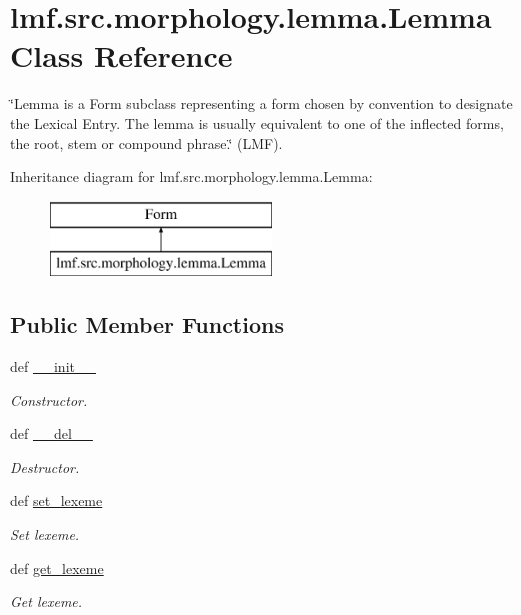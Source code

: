 \hypertarget{classlmf_1_1src_1_1morphology_1_1lemma_1_1_lemma}{\section{lmf.\+src.\+morphology.\+lemma.\+Lemma Class Reference}
\label{classlmf_1_1src_1_1morphology_1_1lemma_1_1_lemma}
}


\char`\"{}\+Lemma is a Form subclass representing a form chosen by convention to designate the Lexical Entry. The lemma is usually equivalent to one of the inflected forms, the root, stem or compound phrase.\char`\"{} (L\+M\+F).  


Inheritance diagram for lmf.\+src.\+morphology.\+lemma.\+Lemma\+:\begin{figure}[H]
\begin{center}
\leavevmode
\includegraphics[height=2.000000cm]{classlmf_1_1src_1_1morphology_1_1lemma_1_1_lemma}
\end{center}
\end{figure}
\subsection*{Public Member Functions}
\begin{DoxyCompactItemize}
\item 
def \hyperlink{classlmf_1_1src_1_1morphology_1_1lemma_1_1_lemma_a17223251bd8318631eccd411fbae8115}{\+\_\+\+\_\+init\+\_\+\+\_\+}
\begin{DoxyCompactList}\small\item\em Constructor. \end{DoxyCompactList}\item 
def \hyperlink{classlmf_1_1src_1_1morphology_1_1lemma_1_1_lemma_afd7a268f1743065f5fc3ee53122ea391}{\+\_\+\+\_\+del\+\_\+\+\_\+}
\begin{DoxyCompactList}\small\item\em Destructor. \end{DoxyCompactList}\item 
def \hyperlink{classlmf_1_1src_1_1morphology_1_1lemma_1_1_lemma_a6d6277e8bb71a04cb31aebccd288b6df}{set\+\_\+lexeme}
\begin{DoxyCompactList}\small\item\em Set lexeme. \end{DoxyCompactList}\item 
def \hyperlink{classlmf_1_1src_1_1morphology_1_1lemma_1_1_lemma_ab1bcf9feeb5f59a7c9af07fbc368fb41}{get\+\_\+lexeme}
\begin{DoxyCompactList}\small\item\em Get lexeme. \end{DoxyCompactList}\end{DoxyCompactItemize}
